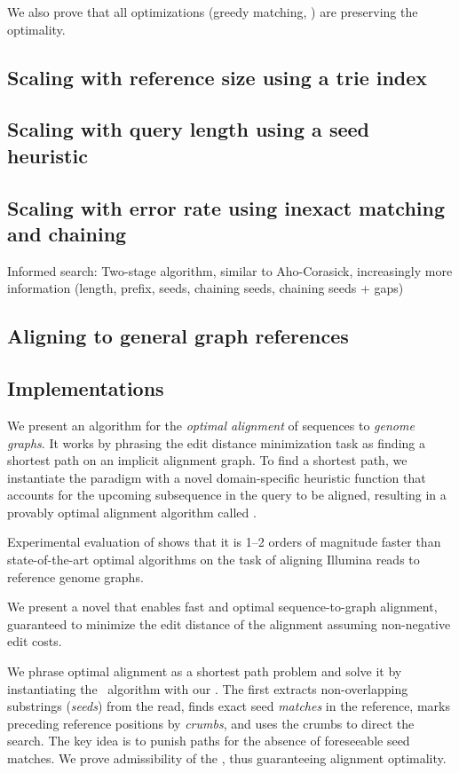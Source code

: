 We also prove that all optimizations (greedy matching, ) are preserving the optimality.

\subsection{Scaling with reference size using a trie index}

\subsection{Scaling with query length using a seed heuristic}

\subsection{Scaling with error rate using inexact matching and chaining}

Informed search: Two-stage algorithm, similar to Aho-Corasick, increasingly more information (length, prefix, seeds, chaining seeds, chaining seeds + gaps)

\subsection{Aligning to general graph references}

\subsection{Implementations}

	
We present an algorithm for the \emph{optimal alignment} of sequences to
\emph{genome graphs}. It works by phrasing the edit distance minimization
task as finding a shortest path on an implicit alignment graph. To find a
shortest path, we instantiate the \A paradigm with a novel domain-specific
heuristic function that accounts for the upcoming subsequence in the query
to be aligned, resulting in a provably optimal alignment algorithm called
\astarix.

Experimental evaluation of \astarix shows that it is 1--2 orders of magnitude
faster than state-of-the-art optimal algorithms on the task of aligning Illumina
reads to reference genome graphs.

We present a novel \A \emph{\seedh} that enables fast and optimal
sequence-to-graph alignment, guaranteed to minimize the edit distance of the
alignment assuming non-negative edit costs.

We phrase optimal alignment as a shortest path problem and solve it by
instantiating the \A~algorithm with our \seedh. The \seedh first extracts
non-overlapping substrings (\emph{seeds}) from the read, finds exact seed
\emph{matches} in the reference, marks preceding reference positions by
\emph{crumbs}, and uses the crumbs to direct the \A search. The key idea is to
punish paths for the absence of foreseeable seed matches. We prove admissibility
of the \seedh, thus guaranteeing alignment optimality.


